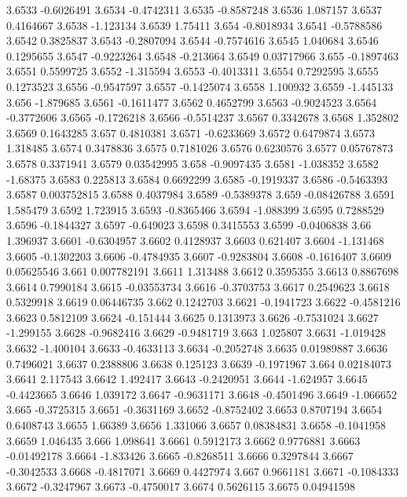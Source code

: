 3.6533  -0.6026491
3.6534  -0.4742311
3.6535  -0.8587248
3.6536  1.087157
3.6537  0.4164667
3.6538  -1.123134
3.6539  1.75411
3.654  -0.8018934
3.6541  -0.5788586
3.6542  0.3825837
3.6543  -0.2807094
3.6544  -0.7574616
3.6545  1.040684
3.6546  0.1295655
3.6547  -0.9223264
3.6548  -0.213664
3.6549  0.03717966
3.655  -0.1897463
3.6551  0.5599725
3.6552  -1.315594
3.6553  -0.4013311
3.6554  0.7292595
3.6555  0.1273523
3.6556  -0.9547597
3.6557  -0.1425074
3.6558  1.100932
3.6559  -1.445133
3.656  -1.879685
3.6561  -0.1611477
3.6562  0.4652799
3.6563  -0.9024523
3.6564  -0.3772606
3.6565  -0.1726218
3.6566  -0.5514237
3.6567  0.3342678
3.6568  1.352802
3.6569  0.1643285
3.657  0.4810381
3.6571  -0.6233669
3.6572  0.6479874
3.6573  1.318485
3.6574  0.3478836
3.6575  0.7181026
3.6576  0.6230576
3.6577  0.05767873
3.6578  0.3371941
3.6579  0.03542995
3.658  -0.9097435
3.6581  -1.038352
3.6582  -1.68375
3.6583  0.225813
3.6584  0.6692299
3.6585  -0.1919337
3.6586  -0.5463393
3.6587  0.003752815
3.6588  0.4037984
3.6589  -0.5389378
3.659  -0.08426788
3.6591  1.585479
3.6592  1.723915
3.6593  -0.8365466
3.6594  -1.088399
3.6595  0.7288529
3.6596  -0.1844327
3.6597  -0.649023
3.6598  0.3415553
3.6599  -0.0406838
3.66  1.396937
3.6601  -0.6304957
3.6602  0.4128937
3.6603  0.621407
3.6604  -1.131468
3.6605  -0.1302203
3.6606  -0.4784935
3.6607  -0.9283804
3.6608  -0.1616407
3.6609  0.05625546
3.661  0.007782191
3.6611  1.313488
3.6612  0.3595355
3.6613  0.8867698
3.6614  0.7990184
3.6615  -0.03553734
3.6616  -0.3703753
3.6617  0.2549623
3.6618  0.5329918
3.6619  0.06446735
3.662  0.1242703
3.6621  -0.1941723
3.6622  -0.4581216
3.6623  0.5812109
3.6624  -0.151444
3.6625  0.1313973
3.6626  -0.7531024
3.6627  -1.299155
3.6628  -0.9682416
3.6629  -0.9481719
3.663  1.025807
3.6631  -1.019428
3.6632  -1.400104
3.6633  -0.4633113
3.6634  -0.2052748
3.6635  0.01989887
3.6636  0.7496021
3.6637  0.2388806
3.6638  0.125123
3.6639  -0.1971967
3.664  0.02184073
3.6641  2.117543
3.6642  1.492417
3.6643  -0.2420951
3.6644  -1.624957
3.6645  -0.4423665
3.6646  1.039172
3.6647  -0.9631171
3.6648  -0.4501496
3.6649  -1.066652
3.665  -0.3725315
3.6651  -0.3631169
3.6652  -0.8752402
3.6653  0.8707194
3.6654  0.6408743
3.6655  1.66389
3.6656  1.331066
3.6657  0.08384831
3.6658  -0.1041958
3.6659  1.046435
3.666  1.098641
3.6661  0.5912173
3.6662  0.9776881
3.6663  -0.01492178
3.6664  -1.833426
3.6665  -0.8268511
3.6666  0.3297844
3.6667  -0.3042533
3.6668  -0.4817071
3.6669  0.4427974
3.667  0.9661181
3.6671  -0.1084333
3.6672  -0.3247967
3.6673  -0.4750017
3.6674  0.5626115
3.6675  0.04941598

